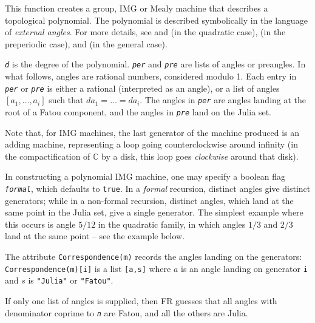 \documentclass[a4paper,11pt]{report}
\begin{document}
{{{ This function creates a group, IMG or Mealy machine that describes a
topological polynomial. The polynomial is described symbolically in the
language of \emph{external angles}. For more details, see \cite{MR762431} and \cite{MR812271} (in the quadratic case), \cite{MR1149891} (in the preperiodic case), and \cite{math.DS/9305207} (in the general case). 

 \mbox{\texttt{\mdseries\slshape d}} is the degree of the polynomial. \mbox{\texttt{\mdseries\slshape per}} and \mbox{\texttt{\mdseries\slshape pre}} are lists of angles or preangles. In what follows, angles are rational
numbers, considered modulo 1. Each entry in \mbox{\texttt{\mdseries\slshape per}} or \mbox{\texttt{\mdseries\slshape pre}} is either a rational (interpreted as an angle), or a list of angles $[a_1,\ldots,a_i]$ such that $da_1=\ldots=da_i$. The angles in \mbox{\texttt{\mdseries\slshape per}} are angles landing at the root of a Fatou component, and the angles in \mbox{\texttt{\mdseries\slshape pre}} land on the Julia set. 

 Note that, for IMG machines, the last generator of the machine produced is an
adding machine, representing a loop going counterclockwise around infinity (in
the compactification of $\mathbb C$ by a disk, this loop goes \emph{clockwise} around that disk). 

 In constructing a polynomial IMG machine, one may specify a boolean flag \mbox{\texttt{\mdseries\slshape formal}}, which defaults to \texttt{true}. In a \emph{formal} recursion, distinct angles give distinct generators; while in a non-formal
recursion, distinct angles, which land at the same point in the Julia set,
give a single generator. The simplest example where this occurs is angle $5/12$ in the quadratic family, in which angles $1/3$ and $2/3$ land at the same point -- see the example below. 

 The attribute \texttt{Correspondence(m)} records the angles landing on the generators: \texttt{Correspondence(m)[i]} is a list \texttt{[a,s]} where $a$ is an angle landing on generator \texttt{i} and $s$ is \texttt{"Julia"} or \texttt{"Fatou"}. 

 If only one list of angles is supplied, then \textsf{FR} guesses that all angles with denominator coprime to \mbox{\texttt{\mdseries\slshape n}} are Fatou, and all the others are Julia. 

}}}
\end{document}
